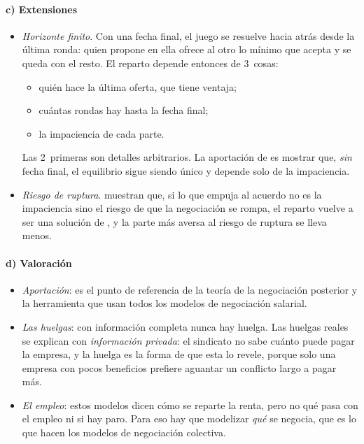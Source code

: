 \documentclass[11pt]{article}
\begin{document}
\paragraph{c) Extensiones}

\begin{itemize}
\item \emph{Horizonte finito}\nocite{Stahl1972Bargaining}. Con una fecha final, el juego se resuelve hacia atrás desde la última ronda: quien propone en ella ofrece al otro lo mínimo que acepta y se queda con el resto. El reparto depende entonces de 3~cosas:
  \begin{itemize}
  \item quién hace la última oferta, que tiene ventaja;
  \item cuántas rondas hay hasta la fecha final;
  \item la impaciencia de cada parte.
  \end{itemize}
  Las 2~primeras son detalles arbitrarios. La aportación de  es mostrar que, \emph{sin} fecha final, el equilibrio sigue siendo único y depende solo de la impaciencia.
\item \emph{Riesgo de ruptura}. \textcite{BinmoreRubinsteinWolinsky1986Nash} muestran que, si lo que empuja al acuerdo no es la impaciencia sino el riesgo de que la negociación se rompa, el reparto vuelve a ser una solución de , y la parte más aversa al riesgo de ruptura se lleva menos.
\end{itemize}

\paragraph{d) Valoración}

\begin{itemize}
\item \emph{Aportación}: es el punto de referencia de la teoría de la negociación posterior y la herramienta que usan todos los modelos de negociación salarial.
\item \emph{Las huelgas}: con información completa nunca hay huelga. Las huelgas reales se explican con \emph{información privada}: el sindicato no sabe cuánto puede pagar la empresa, y la huelga es la forma de que esta lo revele, porque solo una empresa con pocos beneficios prefiere aguantar un conflicto largo a pagar más\nocite{KennanWilson1993Bargaining}.
\item \emph{El empleo}: estos modelos dicen cómo se reparte la renta, pero no qué pasa con el empleo ni si hay paro. Para eso hay que modelizar \emph{qué} se negocia, que es lo que hacen los modelos de negociación colectiva.
\end{itemize}
\end{document}
